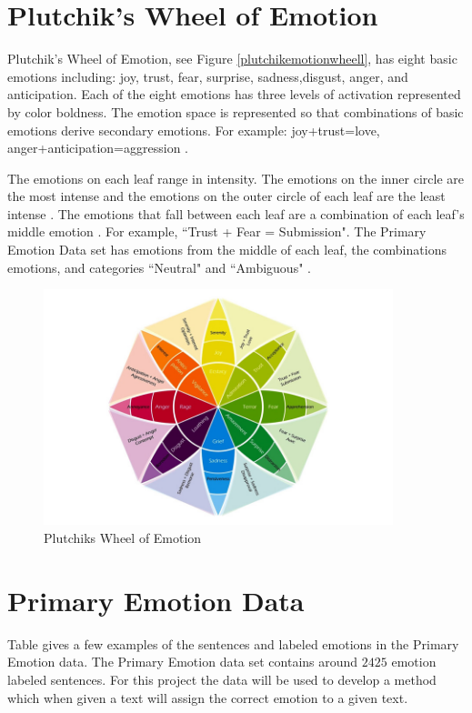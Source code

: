 \documentclass[titlepage,letterpaper]{article}
\begin{document}
\section{Plutchik's Wheel of Emotion}

Plutchik's Wheel of Emotion, see Figure \ref{plutchikemotionwheell}, has eight basic emotions including: joy, trust, fear, surprise, sadness,disgust, anger, and anticipation. Each of the eight emotions has three levels of activation represented by color boldness. The emotion space is represented so that combinations of basic emotions derive secondary emotions. For example: joy+trust=love, anger+anticipation=aggression \cite{plutchik2001nature}.

The emotions on each leaf range in intensity. The emotions on the inner circle are the most intense and the emotions on the outer circle of each leaf are the least intense \cite{WheelofEmotion}. The emotions that fall between each leaf are a combination of each leaf's middle emotion \cite{WheelofEmotion}. For example, ``Trust + Fear = Submission". The Primary Emotion Data set has emotions from the middle of each leaf, the combinations emotions, and categories ``Neutral" and ``Ambiguous" \cite{lowriwilliams}.

\begin{figure}[ht]
	\center
	\includegraphics[width=4in]{PlutchikWheelOfEmotion.jpg}
	\caption{Plutchiks Wheel of Emotion \cite{WheelofEmotion}}
	\label{plutchikemotionwheel}
\end{figure}

\section{Primary Emotion Data}
Table %
gives a few examples of the sentences and labeled emotions in the Primary Emotion data. The Primary Emotion data set contains around $2425$ emotion labeled sentences. For this project the data will be used to develop a method which when given a text will assign the correct emotion to a given text. 
 
\end{document}
